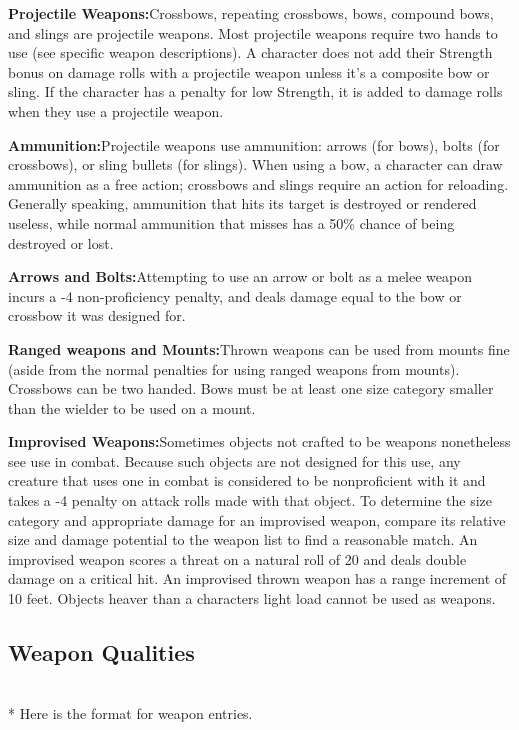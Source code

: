 {\noindent\textbf{Projectile Weapons:}{Crossbows, repeating crossbows, bows, compound bows, and slings are projectile weapons. Most projectile weapons require two hands to use (see specific weapon descriptions). A character does not add their Strength bonus on damage rolls with a projectile weapon unless it's a composite bow or sling. If the character has a penalty for low Strength, it is added to damage rolls when they use a projectile weapon.}

\noindent\textbf{Ammunition:}{Projectile weapons use ammunition: arrows (for bows), bolts (for crossbows), or sling bullets (for slings). When using a bow, a character can draw ammunition as a free action; crossbows and slings require an action for reloading. Generally speaking, ammunition that hits its target is destroyed or rendered useless, while normal ammunition that misses has a 50\% chance of being destroyed or lost.}

\noindent\textbf{Arrows and Bolts:}{Attempting to use an arrow or bolt as a melee weapon incurs a -4 non-proficiency penalty, and deals damage equal to the bow or crossbow it was designed for.}

\noindent\textbf{Ranged weapons and Mounts:}{Thrown weapons can be used from mounts fine (aside from the normal penalties for using ranged weapons from mounts). Crossbows can be two handed. Bows must be at least one size category smaller than the wielder to be used on a mount.}

\noindent\textbf{Improvised Weapons:}{Sometimes objects not crafted to be weapons nonetheless see use in combat. Because such objects are not designed for this use, any creature that uses one in combat is considered to be nonproficient with it and takes a -4 penalty on attack rolls made with that object. To determine the size category and appropriate damage for an improvised weapon, compare its relative size and damage potential to the weapon list to find a reasonable match. An improvised weapon scores a threat on a natural roll of 20 and deals double damage on a critical hit. An improvised thrown weapon has a range increment of 10 feet. Objects heaver than a characters light load cannot be used as weapons.}

\subsection{Weapon Qualities}
~\\*
Here is the format for weapon entries. \\

}
